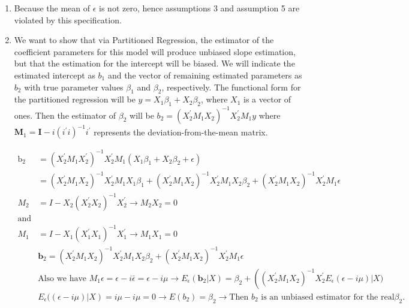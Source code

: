 \documentclass[11pt,reqno]{article}   %
\newcommand{\mlt}[1]{\mathbf{#1}} %
\newcommand{\kt}{^{\prime}}
\begin{document}
\begin{enumerate}
\item
Because the mean of $\epsilon$ is not zero, hence assumptions 3 and assumption 5 are violated by this specification. 
\item
We want to show that via Partitioned Regression, the estimator of the coefficient parameters for this model will produce unbiased slope estimation, but that the estimation for the intercept will be biased. We will indicate the estimated intercept as $b_1$ and the vector of remaining estimated parameters as $b_2$ with true parameter values $\beta_1$ and $\beta_2$, respectively. The functional form for the partitioned regression will be $y = X_1\beta_1 + X_2\beta_2$, where $X_1$ is a vector of ones. Then the estimator of $\beta_2$ will be $b_2 = (X_2\kt M_1 X_2)^{-1}X_2\kt M_1y$
where $\mlt{M}_1=\mlt{I}-i(i\kt i)^{-1}i\kt$ represents the deviation-from-the-mean matrix.

\begin{equation}
\begin{split}
\mathrm{b}_{2}&=\left(X_{2}^{\prime} M_{1} X_{2}^{\prime}\right)^{-1} X_{2}^{\prime} M_{1}\left(X_{1} \beta_{1}+X_{2} \beta_{2}+\epsilon\right)\\
&=\left(X_{2}^{\prime} M_{1} X_{2}\right)^{-1} X_{2}^{\prime} M_{1} X_{1} \beta_{1}+\left(X_{2}^{\prime} M_{1} X_{2}\right)^{-1} X_{2}^{\prime} M_{1} X_{2} \beta_{2}+\left(X_{2}^{\prime} M_{1} X_{2}\right)^{-1} X_{2}^{\prime} M_{1} \epsilon\\
M_{2}&=I-X_{2}\left(X_{2}^{\prime} X_{2}\right)^{-1} X_{2}^{\prime} \rightarrow M_{2}X_{2} = 0\\
\text{and}\\
M_{1}&=I-X_{1}\left(X_{1}^{\prime} X_{1}\right)^{-1} X_{1}^{\prime} \rightarrow M_{1} X_{1}=0\\
&\mathbf{b}_{2}=\left(X_{2}^{\prime} M_{1} X_{2}\right)^{-1} X_{2}^{\prime} M_{1} X_{2} \beta_{2}+\left(X_{2}^{\prime} M_{1} X_{2}\right)^{-1} X_{2}^{\prime} M_{1}\epsilon\\
& \text{Also we have } M_{1} \epsilon=\epsilon-i \bar{\epsilon}=\epsilon-i \mu \longrightarrow E_{\epsilon}\left(\mathbf{b}_{2} | X\right)=\beta_{2}+\left(\left(X_{2}^{\prime} M_{1} X_{2}\right)^{-1} X_{2}^{\prime} E_{\epsilon}(\epsilon-i \mu) | X)\right.\\
&\left.E_{\epsilon}((\epsilon-i \mu)| X\right)=i \mu-i \mu=0 \longrightarrow E\left(b_{2}\right)=\beta_2 \longrightarrow \text{Then } b_2 \text{ is an unbiased estimator for the real} \beta_2.
\end{split}
\end{equation}


\end{enumerate}
\end{document}
